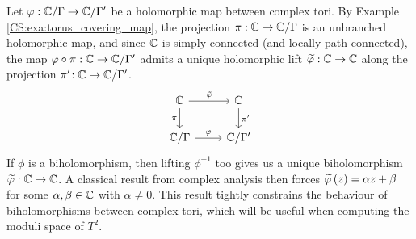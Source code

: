 \documentclass[../Moduli_Spaces_of_Riemann_Surfaces.tex]{subfiles}
\begin{document}
    \begin{example}
        Let $\varphi:\mathbb{C}/\Gamma\to\mathbb{C}/\Gamma'$ be a holomorphic map between complex tori. By Example \ref{CS:exa:torus_covering_map}, the projection $\pi:\mathbb{C}\to\mathbb{C}/\Gamma$ is an unbranched holomorphic map, and since $\mathbb{C}$ is simply-connected (and locally path-connected), the map $\varphi\circ\pi:\mathbb{C}\to\mathbb{C}/\Gamma'$ admits a unique holomorphic lift $\widetilde{\varphi}:\mathbb{C}\to\mathbb{C}$ along the projection $\pi'\!:\mathbb{C}\to\mathbb{C}/\Gamma'$.
        \begin{equation*}
            \begin{tikzcd}
                \C \ar[r, "\tilde{\phi}"] \ar[d, "\pi"'] & \C \ar[d, "\pi'"] \\
                \C/\Gamma \ar[r, "\phi"] & \C/\Gamma'
            \end{tikzcd}
        \end{equation*}
        If $\phi$ is a biholomorphism, then lifting $\phi^{-1}$ too gives us a unique biholomorphism $\widetilde{\varphi}:\mathbb{C}\to\mathbb{C}$. A classical result from complex analysis then forces $\widetilde{\varphi}\left(z\right)=\alpha z+\beta$ for some $\alpha,\beta\in\mathbb{C}$ with $\alpha\neq0$. This result tightly constrains the behaviour of biholomorphisms between complex tori, which will be useful when computing the moduli space of $T^2$.\exqed
    \end{example}
\end{document}
